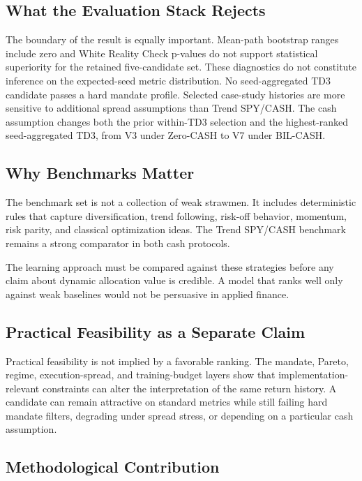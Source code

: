 \documentclass[11pt]{article}
\newcommand{\cashzero}{Zero-CASH}
\newcommand{\cashbil}{BIL-CASH}
\begin{document}
\subsection{What the Evaluation Stack Rejects}

The boundary of the result is equally important. Mean-path bootstrap ranges include zero and White Reality Check p-values do not support statistical superiority for the retained five-candidate set. These diagnostics do not constitute inference on the expected-seed metric distribution. No seed-aggregated TD3 candidate passes a hard mandate profile. Selected case-study histories are more sensitive to additional spread assumptions than Trend SPY/CASH. The cash assumption changes both the prior within-TD3 selection and the highest-ranked seed-aggregated TD3, from V3 under \cashzero{} to V7 under \cashbil{}.

\subsection{Why Benchmarks Matter}

The benchmark set is not a collection of weak strawmen. It includes deterministic rules that capture diversification, trend following, risk-off behavior, momentum, risk parity, and classical optimization ideas. The Trend SPY/CASH benchmark remains a strong comparator in both cash protocols.

The learning approach must be compared against these strategies before any claim about dynamic allocation value is credible. A model that ranks well only against weak baselines would not be persuasive in applied finance.

\subsection{Practical Feasibility as a Separate Claim}

Practical feasibility is not implied by a favorable ranking. The mandate, Pareto, regime, execution-spread, and training-budget layers show that implementation-relevant constraints can alter the interpretation of the same return history. A candidate can remain attractive on standard metrics while still failing hard mandate filters, degrading under spread stress, or depending on a particular cash assumption.

\subsection{Methodological Contribution}
\end{document}
